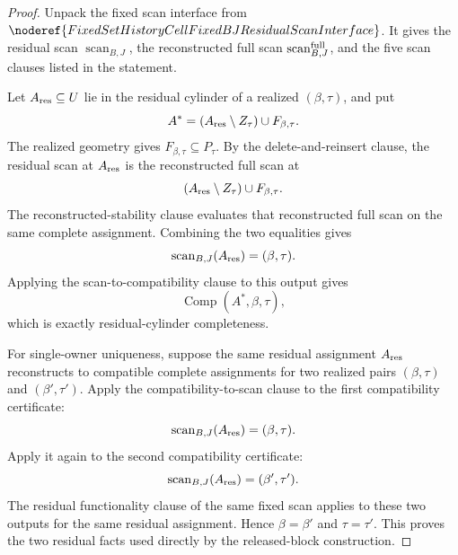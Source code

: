 \begin{proof}
Unpack the fixed scan interface from
\(\noderef{FixedSetHistoryCellFixedBJResidualScanInterface}\).  It gives
the residual scan \(\operatorname{scan}_{B,J}\), the reconstructed full
scan \(\operatorname{scan}^{\rm full}_{B,J}\), and the five scan clauses
listed in the statement.

Let \(A_{\rm res}\subseteq U\) lie in the residual cylinder of a realized
\((\beta,\tau)\), and put
\[
A^\ast=(A_{\rm res}\setminus Z_\tau)\cup F_{\beta,\tau}.
\]
The realized geometry gives \(F_{\beta,\tau}\subseteq P_\tau\).  By the
delete-and-reinsert clause, the residual scan at \(A_{\rm res}\) is the
reconstructed full scan at
\[
(A_{\rm res}\setminus Z_\tau)\cup F_{\beta,\tau}.
\]
The reconstructed-stability clause evaluates that reconstructed full scan
on the same complete assignment.  Combining the two equalities gives
\[
\operatorname{scan}_{B,J}(A_{\rm res})
=(\beta,\tau).
\]
Applying the scan-to-compatibility clause to this output gives
\[
\operatorname{Comp}(A^\ast,\beta,\tau),
\]
which is exactly residual-cylinder completeness.

For single-owner uniqueness, suppose the same residual assignment
\(A_{\rm res}\) reconstructs to compatible complete assignments for two
realized pairs \((\beta,\tau)\) and \((\beta',\tau')\).  Apply the
compatibility-to-scan clause to the first compatibility certificate:
\[
\operatorname{scan}_{B,J}(A_{\rm res})=(\beta,\tau).
\]
Apply it again to the second compatibility certificate:
\[
\operatorname{scan}_{B,J}(A_{\rm res})=(\beta',\tau').
\]
The residual functionality clause of the same fixed scan applies to these
two outputs for the same residual assignment.  Hence
\(\beta=\beta'\) and \(\tau=\tau'\).  This proves the two residual facts
used directly by the released-block construction.
\end{proof}
